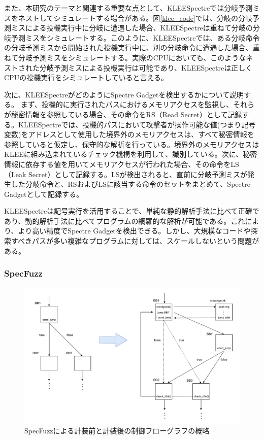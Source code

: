 また、本研究のテーマと関連する重要な点として、KLEESpectreでは分岐予測ミスをネストしてシミュレートする場合がある。図\ref{klee_code}では、分岐の分岐予測ミスによる投機実行中に分岐に遭遇した場合、KLEESpectreは重ねて分岐の分岐予測ミスをシミュレートする。このように、KLEESpectreでは、ある分岐命令の分岐予測ミスから開始された投機実行中に、別の分岐命令に遭遇した場合、重ねて分岐予測ミスをシミュレートする。実際のCPUにおいても、このようなネストされた分岐予測ミスによる投機実行は可能であり\cite{mambretti2019speculator}、KLEESpectreは正しくCPUの投機実行をシミュレートしていると言える。\par
次に、KLEESpectreがどのようにSpectre Gadgetを検出するかについて説明する。
まず、投機的に実行されたパスにおけるメモリアクセスを監視し、それらが秘密情報を参照している場合、その命令をRS（Read Secret）として記録する。KLEESpectreでは、投機的パスにおいて攻撃者が操作可能な値(つまり記号変数)をアドレスとして使用した境界外のメモリアクセスは、すべて秘密情報を参照していると仮定し、保守的な解析を行っている。境界外のメモリアクセスはKLEEに組み込まれているチェック機構を利用して、識別している。次に、秘密情報に依存する値を用いてメモリアクセスが行われた場合、その命令をLS（Leak Secret）として記録する。LSが検出されると、直前に分岐予測ミスが発生した分岐命令と、RSおよびLSに該当する命令のセットをまとめて、Spectre Gadgetとして記録する。\par

KLEESpectreは記号実行を活用することで、単純な静的解析手法に比べて正確であり、動的解析手法に比べてプログラムの網羅的な解析が可能である。これにより、より高い精度でSpectre Gadgetを検出できる。しかし、大規模なコードや探索すべきパスが多い複雑なプログラムに対しては、スケールしないという問題がある。\par

\subsubsection{SpecFuzz}
\label{sec:specfuzz}

\begin{figure}[tb]
  \centering
  \includegraphics[width=\linewidth]{img/specfuzz_instrument.drawio.pdf}
  \caption{SpecFuzzによる計装前と計装後の制御フローグラフの概略}
  \label{fig:specfuzz_instrument}
\end{figure}



